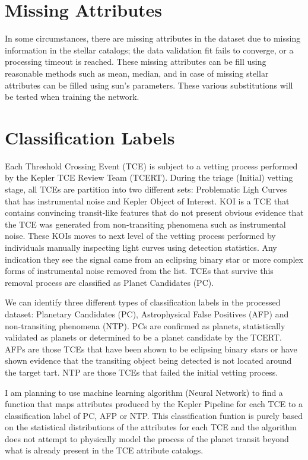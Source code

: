 \section{Missing Attributes}
In some circumstances, there are missing attributes in the dataset due to missing information in the stellar catalogs; the data validation fit fails to converge, or a processing timeout is reached. These missing attributes can be fill using reasonable methods such as mean, median, and in case of missing stellar attributes can be filled using sun's parameters. These various substitutions will be tested when training the network. 

\section{Classification Labels}

Each Threshold Crossing Event (TCE) is subject to a vetting process performed by the Kepler TCE Review Team (TCERT). During the triage (Initial) vetting stage, all TCEs are partition into two different sets: Problematic Ligh Curves that has instrumental noise and Kepler Object of Interest. KOI is a TCE that contains convincing transit-like features that do not present obvious evidence that the TCE was generated from non-transiting phenomena such as instrumental noise. These KOIs moves to next level of the vetting process performed by individuals manually inspecting light curves using detection statistics. Any indication they see the signal came from an eclipsing binary star or more complex forms of instrumental noise removed from the list. TCEs that survive this removal process are classified as Planet Candidates (PC). 


We can identify three different types of classification labels in the processed dataset: Planetary Candidates (PC), Astrophysical False Positives (AFP) and non-transiting phenomena (NTP). PCs are confirmed as planets, statistically validated as planets or determined to be a planet candidate by the TCERT. AFPs are those TCEs that have been shown to be eclipsing binary stars or have shown evidence that the transiting object being detected is not located around the target tart. NTP are those TCEs that failed the initial vetting process. 

I am planning to use machine learning algorithm (Neural Network) to find a function that maps attributes produced by the Kepler Pipeline for each TCE to a classification label of PC, AFP or NTP. This classification funtion is purely based on the statistical distributions of the attributes for each TCE and the algorithm does not attempt to physically model the process of the planet transit beyond what is already present in the TCE attribute catalogs. 
